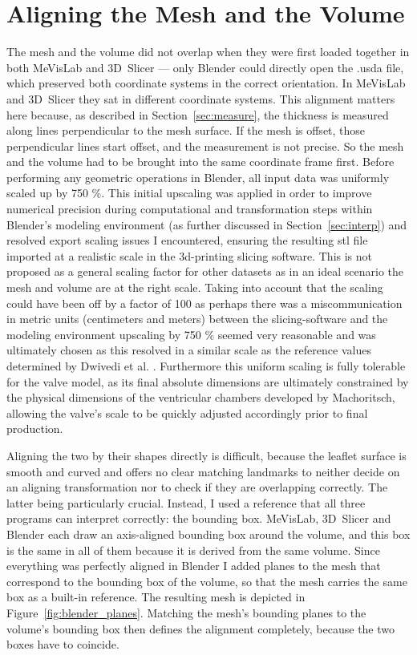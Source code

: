 \section{Aligning the Mesh and the Volume}\label{sec:align}

The mesh and the volume did not overlap when they were first loaded together in both MeVisLab and 3D~Slicer --- only Blender could directly open the .usda file, which preserved both coordinate systems in the correct orientation. In MeVisLab and 3D~Slicer they sat in different coordinate systems. This alignment matters here because, as
described in Section~\ref{sec:measure}, the thickness is measured along lines
perpendicular to the mesh surface. If the mesh is offset, those
perpendicular lines start offset, and the measurement is not precise.
So the mesh and the volume had to be brought into the same coordinate frame
first. Before performing any geometric operations in Blender, all input data was uniformly scaled up by 750 \%. This initial upscaling was applied in order to improve numerical precision during computational and transformation steps within Blender's modeling environment (as further discussed in Section~\ref{sec:interp}) and resolved export scaling issues I encountered, ensuring the resulting \gls{stl} file imported at a realistic scale in the \gls{3d}-printing slicing software. This is not proposed as a general scaling factor for other datasets as in an ideal scenario the mesh and volume are at the right scale. Taking into account that the scaling could have been off by a factor of 100 as perhaps there was a miscommunication in metric units (centimeters and meters) between the slicing-software and the modeling environment upscaling by 750 \% seemed very reasonable and was ultimately chosen as this resolved in a similar scale as the reference values determined by Dwivedi et al. \cite{dwivedi2014reference}. Furthermore this uniform scaling is fully tolerable for the valve model, as its final absolute dimensions are ultimately constrained by the physical dimensions of the ventricular chambers developed by Machoritsch, allowing the valve's scale to be quickly adjusted accordingly prior to final production.

Aligning the two by their shapes directly is difficult, because the leaflet
surface is smooth and curved and offers no clear matching landmarks to neither decide on an aligning transformation nor to check if they are overlapping correctly. The latter being particularly crucial. Instead, I used a reference that all three programs can interpret correctly: the bounding
box. MeVisLab, 3D~Slicer and Blender each draw an axis-aligned bounding box
around the volume, and this box is the same in all of them because it is derived
from the same volume. Since everything was perfectly aligned in Blender I added 
planes to the mesh that correspond to the bounding
box of the volume, so that the mesh carries the same box as a built-in reference. The resulting mesh is depicted in Figure~\ref{fig:blender_planes}. Matching the
mesh's bounding planes to the volume's bounding box then defines the alignment
completely, because the two boxes have to coincide.

